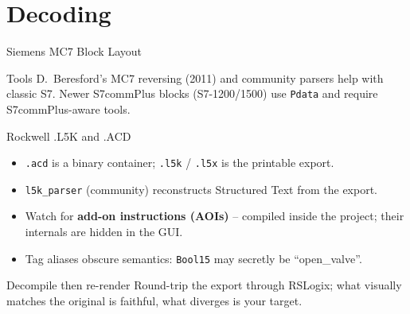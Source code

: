 \documentclass[aspectratio=169,11pt]{beamer}
\begin{document}
\section{Decoding}

\begin{frame}{Siemens MC7 Block Layout}
\centering
{}
\vspace{2mm}
\begin{notebox}{Tools}
D.\ Beresford's MC7 reversing (2011) and community parsers help with classic S7. Newer S7commPlus blocks (S7-1200/1500) use \texttt{Pdata} and require S7commPlus-aware tools.
\end{notebox}
\end{frame}

\begin{frame}{Rockwell .L5K and .ACD}
\begin{itemize}
  \item \texttt{.acd} is a binary container; \texttt{.l5k} / \texttt{.l5x} is the printable export.
  \item \texttt{l5k\_parser} (community) reconstructs Structured Text from the export.
  \item Watch for \textbf{add-on instructions (AOIs)} -- compiled inside the project; their internals are hidden in the GUI.
  \item Tag aliases obscure semantics: \texttt{Bool15} may secretly be ``open\_valve''.
\end{itemize}
\begin{tipbox}{Decompile then re-render}
Round-trip the export through RSLogix; what visually matches the original is faithful, what diverges is your target.
\end{tipbox}
\end{frame}
\end{document}
